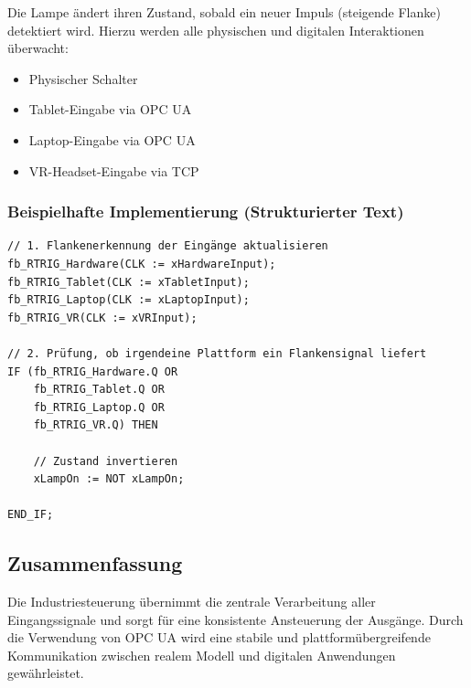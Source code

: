 \documentclass[a4paper,12pt]{article}
\begin{document}
Die Lampe ändert ihren Zustand, sobald ein neuer Impuls (steigende Flanke) detektiert wird. Hierzu werden alle physischen und digitalen Interaktionen überwacht:
\begin{itemize}
    \item Physischer Schalter
    \item Tablet-Eingabe via OPC UA
    \item Laptop-Eingabe via OPC UA
    \item VR-Headset-Eingabe via TCP
\end{itemize}

\subsubsection{Beispielhafte Implementierung (Strukturierter Text)}

\begin{verbatim}
// 1. Flankenerkennung der Eingänge aktualisieren
fb_RTRIG_Hardware(CLK := xHardwareInput);
fb_RTRIG_Tablet(CLK := xTabletInput);
fb_RTRIG_Laptop(CLK := xLaptopInput);
fb_RTRIG_VR(CLK := xVRInput);

// 2. Prüfung, ob irgendeine Plattform ein Flankensignal liefert
IF (fb_RTRIG_Hardware.Q OR 
    fb_RTRIG_Tablet.Q OR 
    fb_RTRIG_Laptop.Q OR 
    fb_RTRIG_VR.Q) THEN
    
    // Zustand invertieren
    xLampOn := NOT xLampOn;
    
END_IF;
\end{verbatim}

\subsection{Zusammenfassung}

Die Industriesteuerung übernimmt die zentrale Verarbeitung aller Eingangssignale und sorgt für eine konsistente Ansteuerung der Ausgänge. 
Durch die Verwendung von OPC UA wird eine stabile und plattformübergreifende Kommunikation zwischen realem Modell und digitalen Anwendungen gewährleistet.


\end{document}
